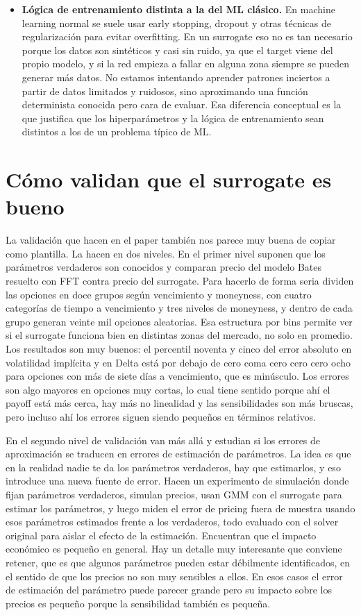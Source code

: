 \documentclass[11pt,a4paper]{article}
\begin{document}
\begin{itemize}
\item \textbf{Lógica de entrenamiento distinta a la del ML clásico.} En machine learning normal se suele usar early stopping, dropout y otras técnicas de regularización para evitar overfitting. En un surrogate eso no es tan necesario porque los datos son sintéticos y casi sin ruido, ya que el target viene del propio modelo, y si la red empieza a fallar en alguna zona siempre se pueden generar más datos. No estamos intentando aprender patrones inciertos a partir de datos limitados y ruidosos, sino aproximando una función determinista conocida pero cara de evaluar. Esa diferencia conceptual es la que justifica que los hiperparámetros y la lógica de entrenamiento sean distintos a los de un problema típico de ML.
\end{itemize}

\section*{Cómo validan que el surrogate es bueno}

La validación que hacen en el paper también nos parece muy buena de copiar como plantilla. La hacen en dos niveles. En el primer nivel suponen que los parámetros verdaderos son conocidos y comparan precio del modelo Bates resuelto con FFT contra precio del surrogate. Para hacerlo de forma seria dividen las opciones en doce grupos según vencimiento y moneyness, con cuatro categorías de tiempo a vencimiento y tres niveles de moneyness, y dentro de cada grupo generan veinte mil opciones aleatorias. Esa estructura por bins permite ver si el surrogate funciona bien en distintas zonas del mercado, no solo en promedio. Los resultados son muy buenos: el percentil noventa y cinco del error absoluto en volatilidad implícita y en Delta está por debajo de cero coma cero cero cero ocho para opciones con más de siete días a vencimiento, que es minúsculo. Los errores son algo mayores en opciones muy cortas, lo cual tiene sentido porque ahí el payoff está más cerca, hay más no linealidad y las sensibilidades son más bruscas, pero incluso ahí los errores siguen siendo pequeños en términos relativos.

En el segundo nivel de validación van más allá y estudian si los errores de aproximación se traducen en errores de estimación de parámetros. La idea es que en la realidad nadie te da los parámetros verdaderos, hay que estimarlos, y eso introduce una nueva fuente de error. Hacen un experimento de simulación donde fijan parámetros verdaderos, simulan precios, usan GMM con el surrogate para estimar los parámetros, y luego miden el error de pricing fuera de muestra usando esos parámetros estimados frente a los verdaderos, todo evaluado con el solver original para aislar el efecto de la estimación. Encuentran que el impacto económico es pequeño en general. Hay un detalle muy interesante que conviene retener, que es que algunos parámetros pueden estar débilmente identificados, en el sentido de que los precios no son muy sensibles a ellos. En esos casos el error de estimación del parámetro puede parecer grande pero su impacto sobre los precios es pequeño porque la sensibilidad también es pequeña.
\end{document}
